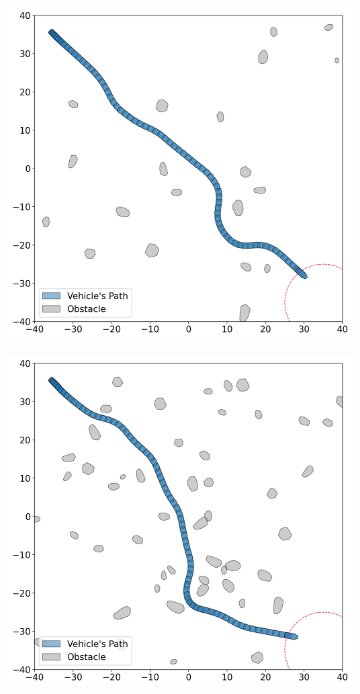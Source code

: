 \begin{figure}[h]
    \captionsetup{justification=centering}
    \centering
    \begin{subfigure}{0.24\textwidth}
        \includegraphics[height=.12\paperheight]{images/demonstration/rigid_flat_3_example12.png}
        \caption{}
        \label{fig:rigid_flat_3_example12}
    \end{subfigure}
    \hfill
    \begin{subfigure}{0.24\textwidth}
        \includegraphics[height=.12\paperheight]{images/demonstration/rigid_flat_9_example22.png}

\end{subfigure}
\end{figure}
